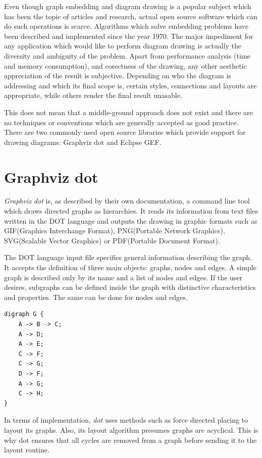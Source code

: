 Even though graph embedding and diagram drawing is a popular subject which has been the topic of articles and research, 
actual open source software which can do such operations is scarce. Algorithms which solve embedding problems have been 
described and implemented since the year 1970. The major impediment for any application which would like to perform 
diagram drawing is actually the diversity and ambiguity of the problem. Apart from performance analysis (time and 
memory consumption), and corectness of the drawing, any other aesthetic appreciation of the result is subjective.
Depending on who the diagram is addressing and which its final scope is, certain styles, connections and layouts are 
appropriate, while others render the final result unasable.

This does not mean that a middle-ground approach does not exist and there are no techniques or conventions which are 
generally accepted as good practice. There are two commonly used open source libraries which provide support for 
drawing diagrams: Graphviz dot and Eclipse GEF.

\section{Graphviz dot}

\emph{Graphviz dot} is, as described by their own documentation, a command line tool which draws directed graphs as 
hierarchies. It reads its information from text files written in the DOT language and outputs the drawing in 
graphic formats such as GIF(Graphics Interchange Format), PNG(Portable Network Graphics), SVG(Scalable Vector 
Graphics) or PDF(Portable Document Format).

The DOT language input file specifies general information describing the graph. It accepts the definition of three 
main objects: graphs, nodes and edges. A simple graph is described only by its name and a list of nodes and edges.
If the user desires, subgraphs can be defined inside the graph with distinctive characteristics and properties. 
The same can be done for nodes and edges.

\begin{lstlisting}[caption={Simple dot file format}]
digraph G {
	A -> B -> C;
	A -> D;
	A -> E;
	C -> F;
	C -> G;
	D -> F;
	A -> G;
	C -> H;
}
\end{lstlisting}

In terms of implementation, \emph{dot} uses methods such as force directed placing to layout its graphs. Also, its 
layout algorithm presumes graphs are acyclical. This is why dot ensures that all cycles are removed from a graph 
before sending it to the layout routine. 

